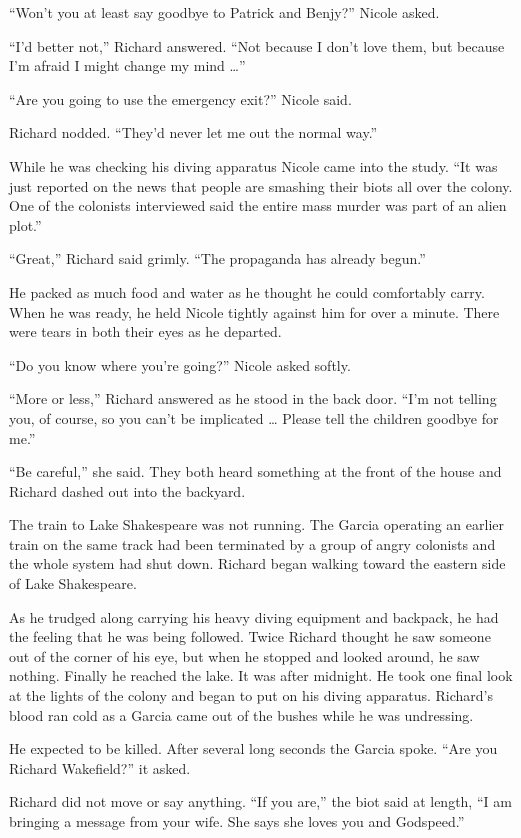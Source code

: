 \documentclass[]{article}
\begin{document}
{“Won’t you at least say goodbye to Patrick and Benjy?” Nicole asked.

“I’d better not,” Richard answered.  “Not because I don’t love them, but because I’m afraid I might change my mind …”

“Are you going to use the emergency exit?” Nicole said.

Richard nodded.  “They’d never let me out the normal way.”

While he was checking his diving apparatus Nicole came into the study.  “It was just reported on the news that people are smashing their biots all over the colony.  One of the colonists interviewed said the entire mass murder was part of an alien plot.”

“Great,” Richard said grimly.  “The propaganda has already begun.”

He packed as much food and water as he thought he could comfortably carry.  When he was ready, he held Nicole tightly against him for over a minute.  There were tears in both their eyes as he departed.

“Do you know where you’re going?” Nicole asked softly.

“More or less,” Richard answered as he stood in the back door.  “I’m not telling you, of course, so you can’t be implicated … Please tell the children goodbye for me.”

“Be careful,” she said.  They both heard something at the front of the house and Richard dashed out into the backyard.

The train to Lake Shakespeare was not running.  The Garcia operating an earlier train on the same track had been terminated by a group of angry colonists and the whole system had shut down.  Richard began walking toward the eastern side of Lake Shakespeare.

As he trudged along carrying his heavy diving equipment and backpack, he had the feeling that he was being followed.  Twice Richard thought he saw someone out of the corner of his eye, but when he stopped and looked around, he saw nothing.  Finally he reached the lake.  It was after midnight.  He took one final look at the lights of the colony and began to put on his diving apparatus.  Richard’s blood ran cold as a Garcia came out of the bushes while he was undressing.

He expected to be killed.  After several long seconds the Garcia spoke.  “Are you Richard Wakefield?” it asked.

Richard did not move or say anything.  “If you are,” the biot said at length, “I am bringing a message from your wife.  She says she loves you and Godspeed.”

}
\end{document}
